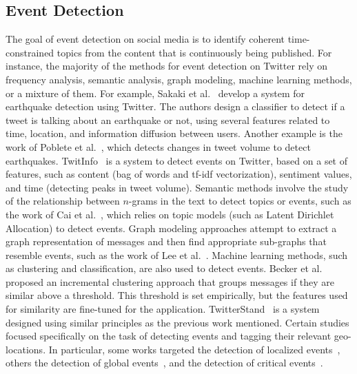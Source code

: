 \subsection{Event Detection} 
%
The goal of event detection on social media is to identify coherent
time-constrained topics from the content that is continuously being published.
%
For instance, the majority of the methods for event detection on Twitter rely on
frequency analysis, semantic analysis, graph modeling, machine learning methods,
or a mixture of them.
%
For example, Sakaki et al.~\cite{Sakaki2010} develop a system for earthquake
detection using Twitter.
%
The authors design a classifier to detect if a tweet is talking about an
earthquake or not, using several features related to time, location, and
information diffusion between users.
%
Another example is the work of Poblete et al.~\cite{poblete2018robust}, which
detects changes in tweet volume to detect earthquakes.
%
TwitInfo~\cite{Marcus:2011:TAV:1978942.1978975} is a system to detect events on
Twitter, based on a set of features, such as content (bag of words and tf-idf
vectorization), sentiment values, and time (detecting peaks in tweet volume).
%
Semantic methods involve the study of the relationship between $n$-grams in the
text to detect topics or events, such as the work of Cai et
al.~\cite{cai2015popular}, which relies on topic models (such as Latent
Dirichlet Allocation) to detect events.
%
Graph modeling approaches attempt to extract a graph representation of messages
and then find appropriate sub-graphs that resemble events, such as the work of
Lee et al.~\cite{Lee:2013:KSK:2487575.2487711,Lee:2014:CCS:2661829.2661859}.
%
Machine learning methods, such as clustering and classification, are also used
to detect events.
%
Becker et al.~\cite{Becker:2010:LSM:1718487.1718524} proposed an incremental
clustering approach that groups messages if they are similar above a threshold.
%
This threshold is set empirically, but the features used for similarity are
fine-tuned for the application.
%
TwitterStand~\cite{Sankaranarayanan:2009:TNT:1653771.1653781} is a system
designed using similar principles as the previous work mentioned.
%
Certain studies focused specifically on the task of detecting events and tagging
their relevant geo-locations.  
%
In particular, some works targeted the detection of localized
events~\cite{Watanabe:Jasmine:2011,Abdelhaq:EvenTweet:2013,Walther:2013fb,Lee:A:2011,Krumm:2015},
others the detection of global events~\cite{sankaranarayanan:twitterstand:2009},
and the detection of critical
events~\cite{Sakaki:Tweet:2013,DeLongueville:2009}.
